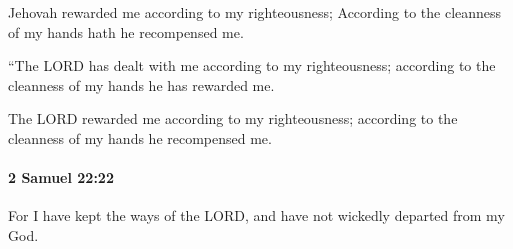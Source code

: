			\begin{versebox}
					\item[BHS] 
					\item[ASV] Jehovah rewarded me according to my righteousness; According to the cleanness of my hands hath he recompensed me.
					\item[NIV] “The LORD has dealt with me according to my righteousness; according to the cleanness of my hands he has rewarded me.
					\item[NRSV] The LORD rewarded me according to my righteousness; according to the cleanness of my hands he recompensed me.
			\end{versebox}

		\paragraph{2 Samuel 22:22} %
			\label{2SAMUEL-22-22}

			For I have kept the ways of the LORD, and have not wickedly departed from my God.


